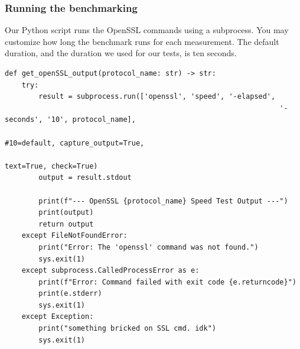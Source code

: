 \documentclass[11pt]{article}
\begin{document}
\subsubsection*{Running the benchmarking}
Our Python script runs the OpenSSL commands using a subprocess. You may customize how long the benchmark runs for each measurement. The default duration, and the duration we used for our tests, is ten seconds.
\begin{framed}
\begin{verbatim}
def get_openSSL_output(protocol_name: str) -> str:
    try:
        result = subprocess.run(['openssl', 'speed', '-elapsed',
																 '-seconds', '10', protocol_name],
																 #10=default, capture_output=True, 
																 text=True, check=True)
        output = result.stdout
        
        print(f"--- OpenSSL {protocol_name} Speed Test Output ---")
        print(output)
        return output
    except FileNotFoundError:
        print("Error: The 'openssl' command was not found.")
        sys.exit(1)
    except subprocess.CalledProcessError as e:
        print(f"Error: Command failed with exit code {e.returncode}")
        print(e.stderr)
        sys.exit(1)
    except Exception:
        print("something bricked on SSL cmd. idk")
        sys.exit(1)
\end{verbatim}
\end{framed}
\end{document}
